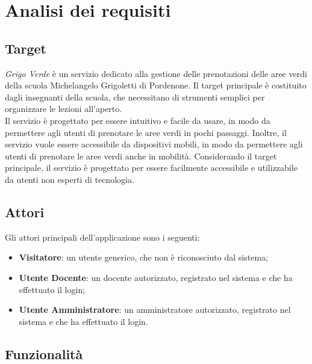 \section{Analisi dei requisiti}

\subsection{Target}

\textit{Grigo Verde} è un servizio dedicato alla gestione delle prenotazioni
delle aree verdi della scuola Michelangelo Grigoletti di Pordenone. Il target
principale è costituito dagli insegnanti della scuola, che necessitano di
strumenti semplici per organizzare le lezioni all'aperto.\\
Il servizio è progettato per essere intuitivo e facile da usare, in modo
da permettere agli utenti di prenotare le aree verdi in pochi passaggi. Inoltre,
il servizio vuole essere accessibile da dispositivi mobili, in
modo da permettere agli utenti di prenotare le aree verdi anche in mobilità.
Considerando il target principale, il servizio è progettato per essere
facilmente accessibile e utilizzabile da utenti non esperti di tecnologia.

\subsection{Attori}

Gli attori principali dell'applicazione sono i seguenti:

\begin{itemize}
	\item \textbf{Visitatore}: un utente generico, che non è riconosciuto dal
	      sistema;

	\item \textbf{Utente Docente}: un docente autorizzato, registrato nel
	      sistema e che ha effettuato il login;

	\item \textbf{Utente Amministratore}: un amministratore autorizzato,
	      registrato nel sistema e che ha effettuato il login.
\end{itemize}

\subsection{Funzionalità}

